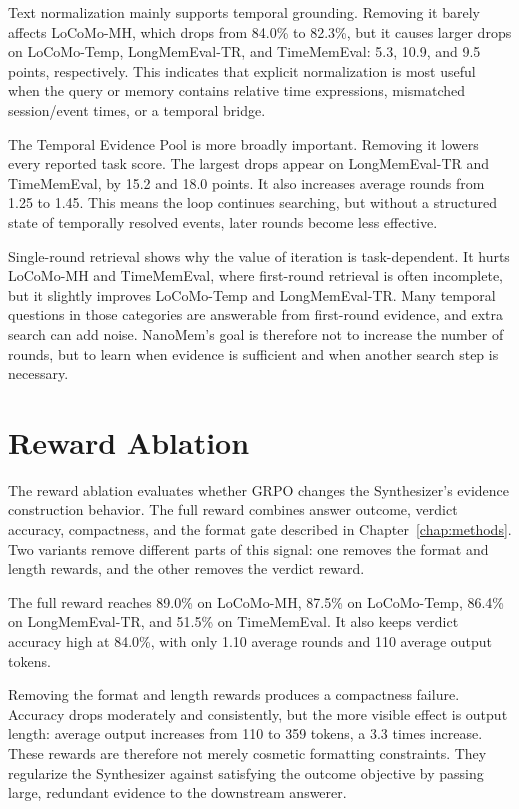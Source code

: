 

Text normalization mainly supports temporal grounding. Removing it barely
affects LoCoMo-MH, which drops from 84.0\% to 82.3\%, but it causes larger
drops on LoCoMo-Temp, LongMemEval-TR, and TimeMemEval: 5.3, 10.9, and 9.5
points, respectively. This indicates that explicit normalization is most useful
when the query or memory contains relative time expressions, mismatched
session/event times, or a temporal bridge.

The Temporal Evidence Pool is more broadly important. Removing it lowers every
reported task score. The largest drops appear on LongMemEval-TR and
TimeMemEval, by 15.2 and 18.0 points. It also increases average rounds from
1.25 to 1.45. This means the loop continues searching, but without a structured
state of temporally resolved events, later rounds become less effective.

Single-round retrieval shows why the value of iteration is task-dependent. It
hurts LoCoMo-MH and TimeMemEval, where first-round retrieval is often
incomplete, but it slightly improves LoCoMo-Temp and LongMemEval-TR. Many
temporal questions in those categories are answerable from first-round evidence,
and extra search can add noise. NanoMem's goal is therefore not to increase the
number of rounds, but to learn when evidence is sufficient and when another
search step is necessary.

\section{Reward Ablation}
\label{sec:reward-ablation-results}
\label{sec:results-reward}

The reward ablation evaluates whether GRPO changes the Synthesizer's evidence
construction behavior. The full reward combines answer outcome, verdict
accuracy, compactness, and the format gate described in
Chapter~\ref{chap:methods}. Two variants remove different parts of this signal:
one removes the format and length rewards, and the other removes the verdict
reward.



The full reward reaches 89.0\% on LoCoMo-MH, 87.5\% on LoCoMo-Temp, 86.4\% on
LongMemEval-TR, and 51.5\% on TimeMemEval. It also keeps verdict accuracy high
at 84.0\%, with only 1.10 average rounds and 110 average output tokens.

Removing the format and length rewards produces a compactness failure. Accuracy
drops moderately and consistently, but the more visible effect is output length:
average output increases from 110 to 359 tokens, a 3.3 times increase. These
rewards are therefore not merely cosmetic formatting constraints. They
regularize the Synthesizer against satisfying the outcome objective by passing
large, redundant evidence to the downstream answerer.

